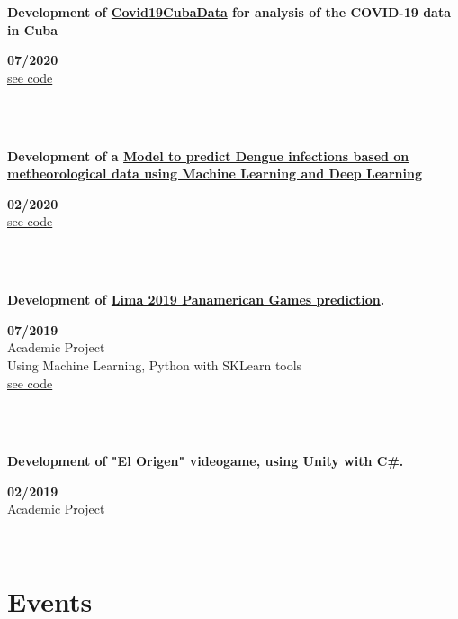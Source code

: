\documentclass{article}
\begin{document}
\begin{minipage}{0.8\textwidth}
\parbox{0.8\linewidth}{\textbf{Development of \hyperref[sec:covid]{Covid19CubaData} for analysis of the COVID-19 data in Cuba}} \hfill \textbf{07/2020}\\
\href{https://github.com/covid19cuba/covid19cuba-action}{see code}\\
\end{minipage} \hfill {}\\\\
\begin{minipage}{0.8\textwidth}
\parbox{0.8\linewidth}{\textbf{Development of a \hyperref[sec:dengue]{Model to predict Dengue infections based on metheorological data using Machine Learning and Deep Learning}}} \hfill \textbf{02/2020}\\
\href{https://github.com/JavierOramas/DengAI}{see code}\\
\end{minipage} \hfill {}\\\\
\begin{minipage}{0.8\textwidth}
\parbox{0.8\linewidth}{\textbf{Development of \hyperref[sec:panamerican]{Lima 2019 Panamerican Games prediction}.}} \hfill \textbf{07/2019}\\
Academic Project\\
Using Machine Learning,  Python with SKLearn tools\\
\href{https://github.com/JavierOramas/PanamericanPredictor}{see code}\\
\end{minipage} \hfill {}\\\\
\begin{minipage}{0.8\textwidth}
\parbox{0.8\linewidth}{\textbf{Development of "El Origen" videogame, using Unity with C\#.}} \hfill \textbf{02/2019}\\
Academic Project\\
\end{minipage} \\

\section*{Events}
\end{document}
